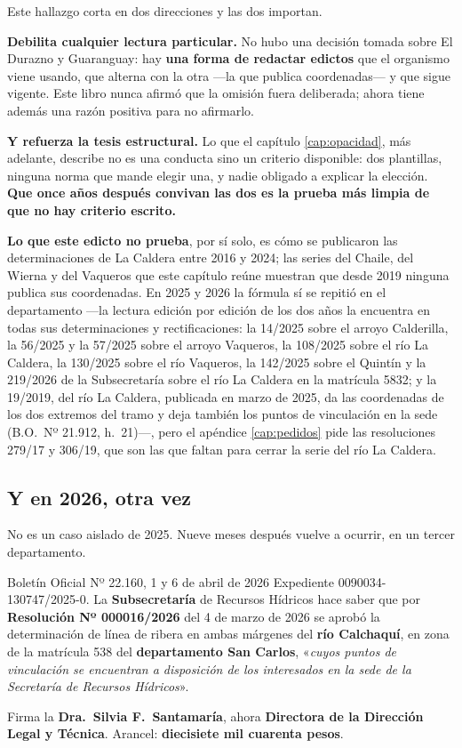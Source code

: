 \begin{cautela}
Este hallazgo corta en dos direcciones y las dos importan.

\textbf{Debilita cualquier lectura particular.} No hubo una decisión tomada sobre El Durazno y
Guaranguay: hay \textbf{una forma de redactar edictos} que el organismo viene usando, que
alterna con la otra ---la que publica coordenadas--- y que sigue vigente. Este libro nunca
afirmó que la omisión fuera deliberada; ahora tiene además una razón positiva para no
afirmarlo.

\textbf{Y refuerza la tesis estructural.} Lo que el capítulo \ref{cap:opacidad}, más adelante, describe no es
una conducta sino un criterio disponible: dos plantillas, ninguna norma que mande elegir una, y
nadie obligado a explicar la elección. \textbf{Que once años después convivan las dos es la
prueba más limpia de que no hay criterio escrito.}

\textbf{Lo que este edicto no prueba}, por sí solo, es cómo se publicaron las determinaciones de La Caldera entre 2016 y 2024; las series del Chaile, del Wierna y del Vaqueros que este capítulo reúne muestran que desde 2019 ninguna publica sus coordenadas. En 2025 y 2026 la fórmula sí se repitió en el departamento ---la lectura edición por edición de los dos años la encuentra en todas sus determinaciones y rectificaciones: la 14/2025 sobre el arroyo Calderilla, la 56/2025 y la 57/2025 sobre el arroyo Vaqueros, la 108/2025 sobre el río La Caldera, la 130/2025 sobre el río Vaqueros, la 142/2025 sobre el Quintín y la 219/2026 de la Subsecretaría sobre el río La Caldera en la matrícula 5832; y la 19/2019, del río La Caldera, publicada en marzo de 2025, da las coordenadas de los dos extremos del tramo y deja también los puntos de vinculación en la sede (B.O.\ Nº 21.912, h.\ 21)---, pero el apéndice \ref{cap:pedidos} pide las resoluciones 279/17 y 306/19, que son las que faltan para cerrar la serie del río La Caldera.
\end{cautela}

\subsection*{Y en 2026, otra vez}

No es un caso aislado de 2025. Nueve meses después vuelve a ocurrir, en un tercer departamento.

\begin{ficha}{Boletín Oficial Nº 22.160, 1 y 6 de abril de 2026}
Expediente 0090034-130747/2025-0. La \textbf{Subsecretaría} de Recursos Hídricos hace saber que
por \textbf{Resolución Nº 000016/2026} del 4 de marzo de 2026 se aprobó la determinación de
línea de ribera en ambas márgenes del \textbf{río Calchaquí}, en zona de la matrícula 538 del
\textbf{departamento San Carlos}, «\textit{cuyos puntos de vinculación se encuentran a
disposición de los interesados en la sede de la Secretaría de Recursos Hídricos}».

Firma la \textbf{Dra.\ Silvia F.\ Santamaría}, ahora \textbf{Directora de la Dirección Legal y
Técnica}. Arancel: \textbf{diecisiete mil cuarenta pesos}.
\end{ficha}

